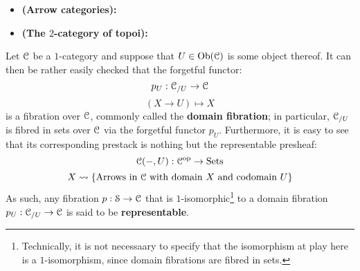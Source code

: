             \begin{example} \label{exmaple: abstract_fibrations}
                \noindent
                \begin{itemize}
                    \item \textbf{(Arrow categories):}
                    \item \textbf{(The $2$-category of topoi):}
                \end{itemize}
            \end{example}
            \begin{example} \label{example: slice_categories_and_representable_fibrations}
                Let $\mathcal{C}$ be a $1$-category and suppose that $U \in \mathrm{Ob}(\mathcal{C})$ is some object thereof. It can then be rather easily checked that the forgetful functor:
                    $$p_U: \mathcal{C}_{/U} \to \mathcal{C}$$
                    $$(X \to U) \mapsto X$$
                is a fibration over $\mathcal{C}$, commonly called the \textbf{domain fibration}; in particular, $\mathcal{C}_{/U}$ is fibred in sets over $\mathcal{C}$ via the forgetful functor $p_U$. Furthermore, it is easy to see that its corresponding prestack is nothing but the representable presheaf:
                    $$\mathcal{C}(-, U): \mathcal{C}^{\mathrm{op}} \to \mathrm{Sets}$$
                    $$X \leadsto \{\text{Arrows in $\mathcal{C}$ with domain $X$ and codomain $U$}\}$$
                As such, any fibration $p: \mathcal{S} \to \mathcal{C}$ that is $1$-isomorphic\footnote{Technically, it is not necessaary to specify that the isomorphism at play here is a $1$-isomorphism, since domain fibrations are fibred in sets.} to a domain fibration $p_U: \mathcal{C}_{/U} \to \mathcal{C}$ is said to be \textbf{representable}.
            \end{example}
            \begin{example} \label{example: fibred_categories_of_quasi_coherent_sheaves}
                
            \end{example}
            \begin{example} \label{example: fibred_categories_of_finite_etale_morphisms}
                
            \end{example}
